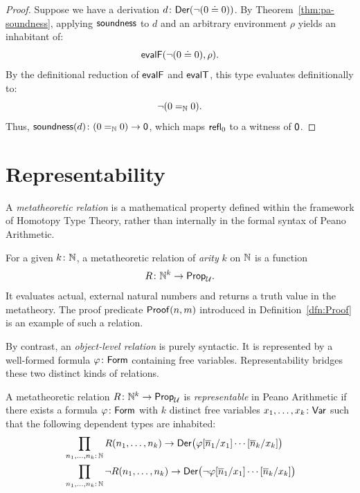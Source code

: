 \begin{proof}
    Suppose we have a derivation $d\colon\fun{Der}(\neg(0\doteq 0))$. By Theorem~\ref{thm:pa-soundness}, applying $\mathsf{soundness}$ to $d$ and an arbitrary environment $\rho$ yields an inhabitant of:
    \[
        \mathsf{evalF}(\neg(0\doteq 0),\rho).
    \]
    By the definitional reduction of $\mathsf{evalF}$ and $\mathsf{evalT}$, this type evaluates definitionally to:
    \[
        \neg(0\mathrel{=_{\mathbb{N}}}0).
    \]
    Thus, $\fun{soundness}(d)\colon(0\eq\N0)\to\fun0$, which maps $\mathsf{refl}_0$ to a witness of $\mathsf{0}$.
    
\end{proof}

\section{Representability}

A \textsl{metatheoretic relation} is a mathematical property defined within the framework of Homotopy Type Theory, rather than internally in the formal syntax of Peano Arithmetic.
 
For a given $k\colon\N$, a metatheoretic relation of \textsl{arity} $k$ on $\mathbb{N}$ is a function
\[
    R\colon\N^k\to\fun{Prop}_\univ.
\]
It evaluates actual, external natural numbers and returns a truth value in the metatheory. The proof predicate $\mathsf{Proof}(n,m)$ introduced in Definition~\ref{dfn:Proof} is an example of such a relation.

By contrast, an \textsl{object-level relation} is purely syntactic. It is represented by a well-formed formula $\varphi\colon\fun{Form}$ containing free variables. Representability bridges these two distinct kinds of relations.

\begin{defn} 
    A metatheoretic relation $R\colon\N^k\to\fun{Prop}_\univ$ is \textsl{representable} in Peano Arithmetic if there exists a formula $\varphi\colon\fun{Form}$ with $k$ distinct free variables $x_1,\dots,x_k\colon\fun{Var}$ such that the following dependent types are inhabited:
    \begin{align*}
        &\prod_{n_1,\dots,n_k\colon\N}R(n_1,\dots,n_k) 
        \to 
        \fun{Der}\bigl(
            \varphi[\num n_1/x_1]\cdots[\num n_k/x_k]
        \bigr)\\
        &\prod_{n_1,\dots,n_k\colon\N}
            \neg R(n_1,\dots,n_k) 
            \to 
            \fun{Der}\bigl(
                \neg\varphi[\num n_1/x_1]
                    \cdots[\num n_k/x_k]
        \bigr)
    \end{align*}

\end{defn}


